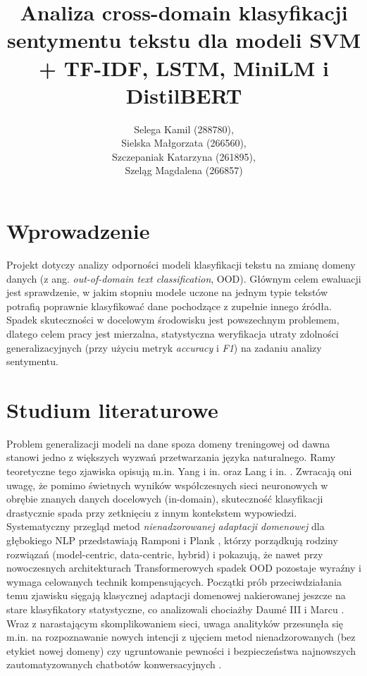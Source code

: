 \documentclass[runningheads]{llncs}
\title{Analiza cross-domain klasyfikacji sentymentu tekstu dla modeli SVM + TF-IDF, LSTM, MiniLM i DistilBERT}
\author{Selega Kamil (288780),\\ Sielska Małgorzata (266560),\\ Szczepaniak Katarzyna (261895),\\ Szeląg Magdalena (266857)}
\institute{
Politechnika Wrocławska\\
 Wydział Informatyki i Telekomunikacji (W4N)\\
 Kierunek: Zaufane Systemy Sztucznej Inteligencji (TAI) \\
 Kurs: Przetwarzanie Języka Naturalnego
}
\date{}
\begin{document}
\maketitle

\section*{Wprowadzenie}
Projekt dotyczy analizy odporności modeli klasyfikacji tekstu na zmianę domeny danych (z ang. \textit{out-of-domain text classification}, OOD). Głównym celem ewaluacji jest sprawdzenie, w jakim stopniu modele uczone na jednym typie tekstów potrafią poprawnie klasyfikować dane pochodzące z zupełnie innego źródła. Spadek skuteczności w docelowym środowisku jest powszechnym problemem, dlatego celem pracy jest mierzalna, statystyczna weryfikacja utraty zdolności generalizacyjnych (przy użyciu metryk \textit{accuracy} i \textit{F1}) na zadaniu analizy sentymentu.

\section*{Studium literaturowe}
Problem generalizacji modeli na dane spoza domeny treningowej od dawna stanowi jedno z większych wyzwań przetwarzania języka naturalnego. Ramy teoretyczne tego zjawiska opisują m.in. Yang i in. \cite{yang2023outofdistributiongeneralizationtextclassification} oraz Lang i in. \cite{lang2023surveyoutofdistributiondetectionnlp}. Zwracają oni uwagę, że pomimo świetnych wyników współczesnych sieci neuronowych w obrębie znanych danych docelowych (in-domain), skuteczność klasyfikacji drastycznie spada przy zetknięciu z innym kontekstem wypowiedzi. Systematyczny przegląd metod \emph{nienadzorowanej adaptacji domenowej} dla głębokiego NLP przedstawiają Ramponi i Plank \cite{ramponi-plank-2020-neural}, którzy porządkują rodziny rozwiązań (model-centric, data-centric, hybrid) i pokazują, że nawet przy nowoczesnych architekturach Transformerowych spadek OOD pozostaje wyraźny i wymaga celowanych technik kompensujących. Początki prób przeciwdziałania temu zjawisku sięgają klasycznej adaptacji domenowej nakierowanej jeszcze na stare klasyfikatory statystyczne, co analizowali chociażby Daumé III i Marcu \cite{DBLP:journals/corr/abs-1109-6341}. Wraz z narastającym skomplikowaniem sieci, uwaga analityków przesunęła się m.in. na rozpoznawanie nowych intencji z ujęciem metod nienadzorowanych (bez etykiet nowej domeny) \cite{9741317} czy ugruntowanie pewności i bezpieczeństwa najnowszych zautomatyzowanych chatbotów konwersacyjnych \cite{9052492}.
\end{document}
